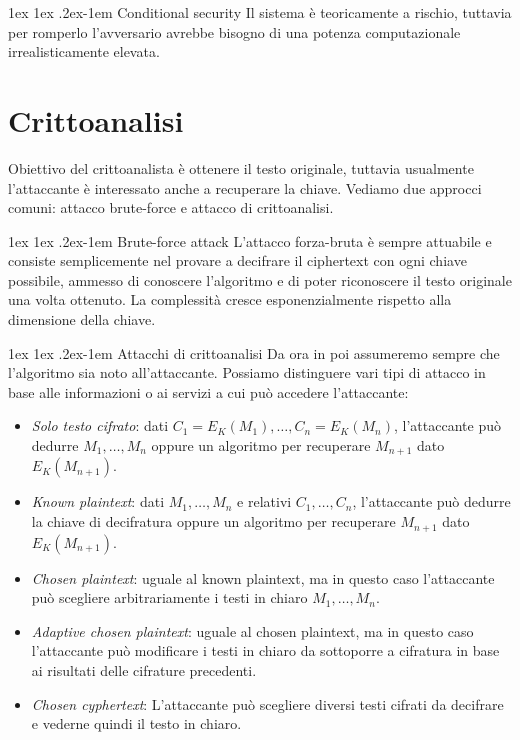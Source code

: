 \documentclass[a4paper, 11pt, twoside, openright, fleqn]{report}
\makeatletter
\renewcommand{\paragraph}{%
	\@startsection{paragraph}{4}%
	{\z@}{1ex \@plus 1ex \@minus .2ex}{-1em}%
	{\normalfont\normalsize\bfseries}%
}
\makeatother
\begin{document}
\paragraph{Conditional security} Il sistema è teoricamente a rischio, tuttavia per romperlo l'avversario avrebbe bisogno di una potenza computazionale irrealisticamente elevata.

\section{Crittoanalisi}
Obiettivo del crittoanalista è ottenere il testo originale, tuttavia usualmente l'attaccante è interessato anche a recuperare la chiave. Vediamo due approcci comuni:
attacco brute-force e attacco di crittoanalisi.

\paragraph{Brute-force attack}
L'attacco forza-bruta è sempre attuabile e consiste semplicemente nel provare a decifrare il ciphertext con ogni chiave possibile, ammesso di conoscere l'algoritmo e di poter riconoscere il testo originale una volta ottenuto. La complessità cresce esponenzialmente rispetto alla dimensione della chiave.

\paragraph{Attacchi di crittoanalisi}
Da ora in poi assumeremo sempre che l'algoritmo sia noto all'attaccante. Possiamo distinguere vari tipi di attacco in base alle informazioni o ai servizi a cui può accedere l'attaccante:
\begin{itemize}
	\item \emph{Solo testo cifrato}: dati $C_1 = E_K(M_1), \dots, C_n = E_K(M_n)$, l'attaccante può dedurre $M_1, \dots, M_n$ oppure un algoritmo per recuperare $M_{n+1}$ dato $E_K(M_{n+1})$.
	\item \emph{Known plaintext}: dati $M_1, \dots, M_n$ e relativi $C_1, \dots, C_n$, l'attaccante può dedurre la chiave di decifratura oppure un algoritmo per recuperare $M_{n+1}$ dato $E_K(M_{n+1})$.
	\item \emph{Chosen plaintext}: uguale al known plaintext, ma in questo caso l'attaccante può scegliere arbitrariamente i testi in chiaro $M_1, \dots, M_n$.
	\item \emph{Adaptive chosen plaintext}: uguale al chosen plaintext, ma in questo caso l'attaccante può modificare i testi in chiaro da sottoporre a cifratura in base ai risultati delle cifrature precedenti.
	\item \emph{Chosen cyphertext}: L'attaccante può scegliere diversi testi cifrati da decifrare e vederne quindi il testo in chiaro.
\end{itemize}
\end{document}
